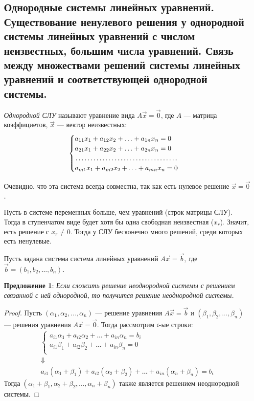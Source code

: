 \documentclass[a4paper, 12pt]{article}
\begin{document}
\subsection{Однородные системы линейных уравнений. Существование ненулевого решения у однородной системы линейных уравнений с числом неизвестных, большим числа уравнений. Связь между множествами решений системы линейных уравнений и соответствующей однородной системы.}
\textit{Однородной СЛУ} называют уравнение вида $A\vec{x} = \vec{0}$, где $A$ --- матрица коэффициетов, $\vec{x}$ --- вектор неизвестных:
\[\begin{cases}
a_{11}x_1 + a_{12}x_2 + \ldots + a_{1n}x_n = 0 \\
a_{21}x_1 + a_{22}x_2 + \ldots + a_{2n}x_n = 0 \\
\dotfill \\
a_{m1}x_1 + a_{m2}x_2 + \ldots + a_{mn}x_n = 0 \\
\end{cases}\]

Очевидно, что эта система всегда совместна, так как есть нулевое решение $\vec{x} = \vec{0}$.

Пусть в системе переменных больше, чем уравнений (строк матрицы СЛУ). Тогда в ступенчатом виде будет хотя бы одна свободная неизвестная ($x_r$). Значит, есть решение с $x_r \neq 0$. Тогда у СЛУ бесконечно много решений, среди которых есть ненулевые.

Пусть задана система система линейных уравнений $A\vec{x} = \vec{b}$, где $\vec{b} = (b_1, b_2, \ldots, b_n)$.

\textbf{Предложение 1}: \textit{Если сложить решение неоднородной системы с решением связанной с ней однородной, то получится решение неоднородной системы.}
\begin{proof}
Пусть $(\alpha_1, \alpha_2, \ldots, \alpha_n)$ --- решение уравнения $A\vec{x} = \vec{b}$ и $(\beta_1, \beta_2, \ldots, \beta_n)$ --- решения уравнения $A\vec{x} = \vec{0}$. Тогда рассмотрим $i$-ые строки:
\begin{gather*}
\begin{cases}
a_{i1}\alpha_1 + a_{i2}\alpha_2 + \ldots + a_{in}\alpha_n = b_i \\
a_{i1}\beta_1 + a_{i2}\beta_2 + \ldots + a_{in}\beta_n = 0 \\
\end{cases}\\
\Downarrow\\
a_{i1}(\alpha_1 + \beta_1) + a_{i2}(\alpha_2 + \beta_2) + \ldots + a_{in}(\alpha_n + \beta_n) = b_i
\end{gather*}
Тогда $(\alpha_1 + \beta_1, \alpha_2 + \beta_2, \ldots, \alpha_n + \beta_n)$ также является решением неоднородной системы.
\end{proof}
\end{document}

